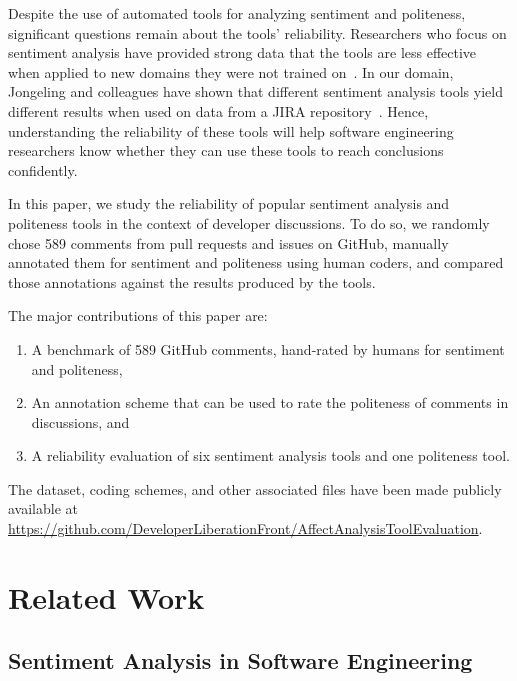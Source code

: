 Despite the use of automated tools for analyzing sentiment and 
politeness, significant questions remain about the tools' reliability.
Researchers who focus on sentiment analysis have provided strong data
that the tools are less effective when applied to new domains they 
were not trained on~\cite{novielli2015challenges,gamon2005pulse}. 
In our domain, Jongeling and colleagues have 
shown that different sentiment analysis tools yield different 
results when used on data from a JIRA repository~\cite{jongeling2017negative}. 
Hence, understanding the reliability of these tools will help 
software engineering researchers know whether they can use these
tools to reach conclusions confidently.

In this paper, we study the reliability of popular sentiment analysis 
and politeness tools in the context of developer discussions.
To do so, we randomly chose 589 comments from pull requests and issues on GitHub,
manually annotated them for sentiment and politeness using human coders,
and compared those annotations against the results produced by the tools. 

The major contributions of this paper are:
\begin{enumerate}
    \item A benchmark of 589 GitHub comments, 
    hand-rated by humans for sentiment and politeness, 
    \item An annotation scheme that can be used to rate 
    the politeness of comments in discussions, and
    \item A reliability evaluation of six sentiment analysis 
    tools and one politeness tool.
\end{enumerate}

The dataset, coding schemes, and other associated files have been made publicly available at \url{https://github.com/DeveloperLiberationFront/AffectAnalysisToolEvaluation}.


\section{Related Work}\label{relwork}
\subsection{Sentiment Analysis in Software Engineering}\label{rwsent}

